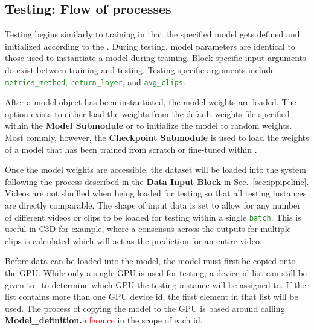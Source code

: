 \documentclass{llncs}
\begin{document}
\subsection{Testing: Flow of processes}
\label{sec:testing}

Testing begins similarly to training in that the specified model gets defined and initialized according to the \modeldef.
During testing, model parameters are identical to those used to instantiate a model during training.
Block-specific input arguments do exist between training and testing.
Testing-specific arguments include \texttt{\textcolor{ForestGreen}{metrics\_method}}, \texttt{\textcolor{ForestGreen}{return\_layer}}, and \texttt{\textcolor{ForestGreen}{avg\_clips}}.

After a model object has been instantiated, the model weights are loaded.
The option exists to either load the weights from the default weights file specified within the \textbf{Model Submodule} or to initialize the model to random weights.
Most commly, however, the \textbf{Checkpoint Submodule} is used to load the weights of a model that has been trained from scratch or fine-tuned within \acro.

Once the model weights are accessible, the dataset will be loaded into the system following the process described in the \textbf{Data Input Block} in Sec.~\ref{sec:ippipeline}.
Videos are not shuffled when being loaded for testing so that all testing instances are directly comparable.
The shape of input data is set to allow for any number of different videos or clips to be loaded for testing within a single \texttt{\textcolor{ForestGreen}{batch}}.
This is useful in C3D for example, where a consensus across the outputs for multiple clips is calculated which will act as the prediction for an entire video.

Before data can be loaded into the model, the model must first be copied onto the GPU.
While only a single GPU is used for testing, a device id list can still be given to \acro~to determine which GPU the testing instance will be assigned to.
If the list contains more than one GPU device id, the first element in that list will be used.
The process of copying the model to the GPU is based around calling \textbf{Model\_definition.}\textcolor{red}{inference} in the scope of each id.
\end{document}
